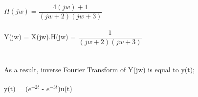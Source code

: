 \documentclass[10pt,a4paper, margin=1in]{article}
\begin{document}
\begin{enumerate}
\begin{enumerate}
     $ H(jw)=   \dfrac{4(jw) +1}{(jw+2)(jw+3)}$\\\\
     Y(jw) = X(jw).H(jw) = $ \dfrac{1}{(jw+2)(jw+3)} $\\\\\\
     As a result, inverse Fourier Transform of Y(jw) is equal to y(t);\\\\
     y(t) = ($e^{-2t}$ - $e^{-3t}$)u(t)
     
    
    \end{enumerate}



\end{enumerate}
\end{document}
